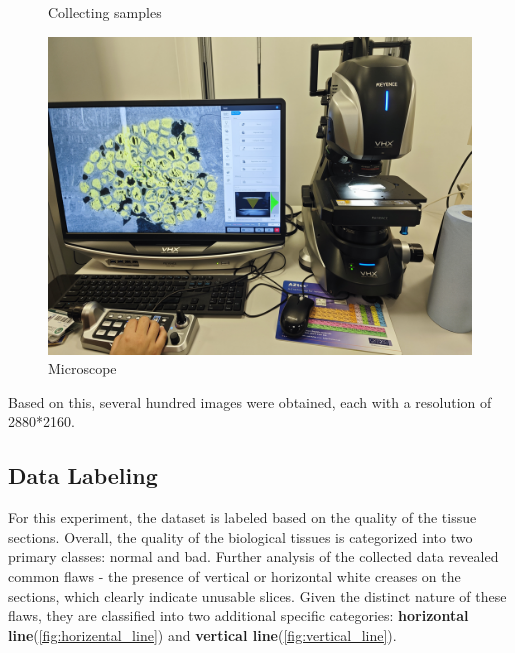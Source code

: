 \begin{figure}[htbp]
\begin{minipage}{0.3\textwidth}
        \caption{Collecting samples}
        \label{fig:采集样本}
    \end{minipage}
    \begin{minipage}{0.35\textwidth}
        \centering
        \includegraphics[width=\textwidth]{./fig/显微镜.jpg}
        \caption{Microscope}
        \label{fig:显微镜}
    \end{minipage}
\end{figure}


Based on this, several hundred images were obtained, each with a resolution of 2880*2160. 




\subsection{Data Labeling}

For this experiment, the dataset is labeled based on the quality of the tissue sections. Overall, the quality of the biological tissues is categorized into two primary classes: normal and bad. Further analysis of the collected data revealed common flaws - the presence of vertical or horizontal white creases on the sections, which clearly indicate unusable slices. Given the distinct nature of these flaws, they are classified into two additional specific categories: \textbf{horizontal line}(\autoref{fig:horizental_line}) and \textbf{vertical line}(\autoref{fig:vertical_line}).

